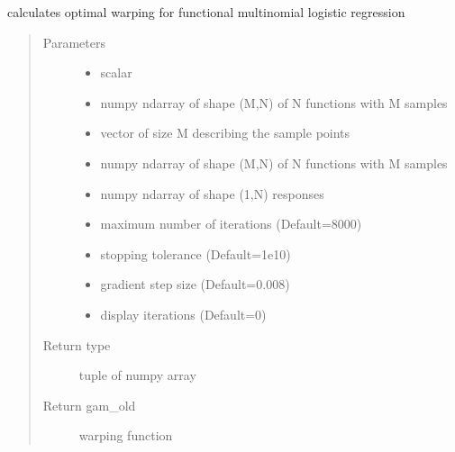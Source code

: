 \documentclass[letterpaper,10pt,english]{sphinxmanual}
\begin{document}
\begin{fulllineitems}
\label{\detokenize{regression:regression.mlogit_warp_grad}}
calculates optimal warping for functional multinomial logistic regression
\begin{quote}\begin{description}
\item[{Parameters}] \leavevmode\begin{itemize}
\item {} 
 \textendash{} scalar

\item {} 
 \textendash{} numpy ndarray of shape (M,N) of N functions with M samples

\item {} 
 \textendash{} vector of size M describing the sample points

\item {} 
 \textendash{} numpy ndarray of shape (M,N) of N functions with M samples

\item {} 
 \textendash{} numpy ndarray of shape (1,N) responses

\item {} 
 \textendash{} maximum number of iterations (Default=8000)

\item {} 
 \textendash{} stopping tolerance (Default=1e\sphinxhyphen{}10)

\item {} 
 \textendash{} gradient step size (Default=0.008)

\item {} 
 \textendash{} display iterations (Default=0)

\end{itemize}

\item[{Return type}] \leavevmode
tuple of numpy array

\item[{Return gam\_old}] \leavevmode
warping function

\end{description}\end{quote}

\end{fulllineitems}
\end{document}
